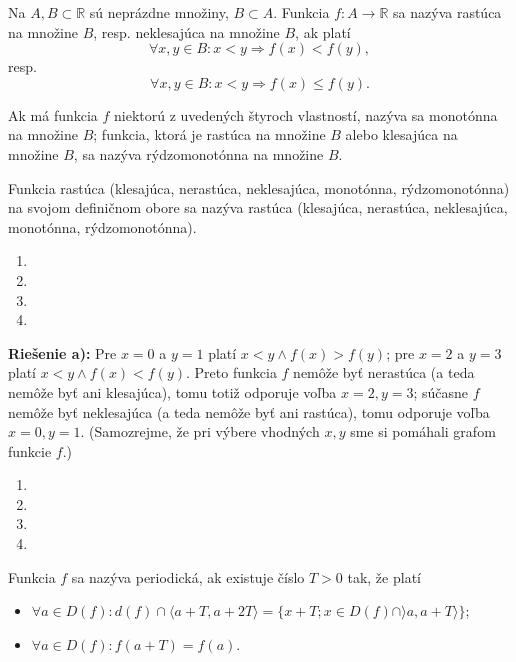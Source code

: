 Na $A,B\subset\mathbb{R}$ sú neprázdne množiny, $B\subset A$. Funkcia $f:A\rightarrow\mathbb{R}$ sa nazýva rastúca na množine $B$, resp. neklesajúca na množine $B$, ak platí $$\forall x,y\in B:x<y\Rightarrow f(x)<f(y),$$ resp. $$\forall x,y\in B:x<y\Rightarrow f(x)\leq f(y).$$

Ak má funkcia $f$ niektorú z uvedených štyroch vlastností, nazýva sa monotónna na množine $B$; funkcia, ktorá je rastúca na množine $B$ alebo klesajúca na množine $B$, sa nazýva rýdzomonotónna na množine $B$.

Funkcia rastúca (klesajúca, nerastúca, neklesajúca, monotónna, rýdzomonotónna) na svojom definičnom obore sa nazýva rastúca (klesajúca, nerastúca, neklesajúca, monotónna, rýdzomonotónna).

\begin{enumerate}[resume]
  \item {}
  \item {}
  \item {}
  \item {}
\end{enumerate}

\textbf{Riešenie a):} Pre $x=0$ a $y=1$ platí $x<y\wedge f(x)>f(y)$; pre $x=2$ a $y=3$ platí $x<y\wedge f(x)<f(y)$. Preto funkcia $f$ nemôže byť nerastúca (a teda nemôže byť ani klesajúca), tomu totiž odporuje voľba $x=2,y=3$; súčasne $f$ nemôže byť neklesajúca (a teda nemôže byť ani rastúca), tomu odporuje voľba $x=0,y=1$. (Samozrejme, že pri výbere vhodných $x,y$ sme si pomáhali grafom funkcie $f$.)

\begin{enumerate}[resume]
  \item {}
  \item {}
  \item {}
  \item {}
\end{enumerate}

Funkcia $f$ sa nazýva periodická, ak existuje číslo $T>0$ tak, že platí
\begin{itemize}
\item $\forall a\in D(f):d(f)\cap \langle a+T,a+2T\rangle=\{x+T;x\in D(f)\cap \rangle a,a+T\rangle\}$;
\item  $\forall a\in D(f):f(a+T)=f(a)$.
\end{itemize}


